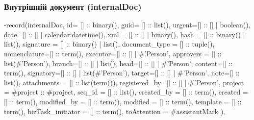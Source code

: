 \documentclass{article}
\let\originalfootnotesize\footnotesize
\let\oldverbatim\verbatim
\let\oldendverbatim\endverbatim
\renewenvironment{verbatim}{\originalfootnotesize\oldverbatim}{\oldendverbatim}
\begin{document}
\subsubsection{Внутрішній документ (internalDoc)}
\begin{verbatim}
-record(internalDoc, { id= [] :: binary(),
                       guid= [] :: list(),
                       urgent=[] :: [] | boolean(),
                       date=[] :: [] | calendar:datetime(),
                       xml = [] :: [] | binary(),
                       hash = [] :: binary() | list(),
                       signature = [] :: binary() | list(),
                       document_type = [] :: tuple(),
                       nomenclature=[] :: term(),
                       executor=[] :: [] | #'Person'{},
                       approvers = [] :: list(#'Person'{}),
                       branch=[] :: [] | list(),
                       head=[] :: [] | #'Person'{},
                       content=[] :: term(),
                       signatory=[] :: [] | list(#'Person'{}),
                       target=[] :: [] | #'Person'{},
                       note=[] :: list(),
                       attachments = [] :: list(term()),
                       registered_by=[] :: [] | #'Person'{},
                       project = #project{} :: #project{},
                       seq_id = [] :: list(),
                       created_by = [] :: term(),
                       created = [] :: term(),
                       modified_by = [] :: term(),
                       modified = [] :: term(),
                       template = [] :: term(),
                       bizTask_initiator = [] :: term(),
                       toAttention = #assistantMark{}
                      }).
\end{verbatim}
\end{document}
